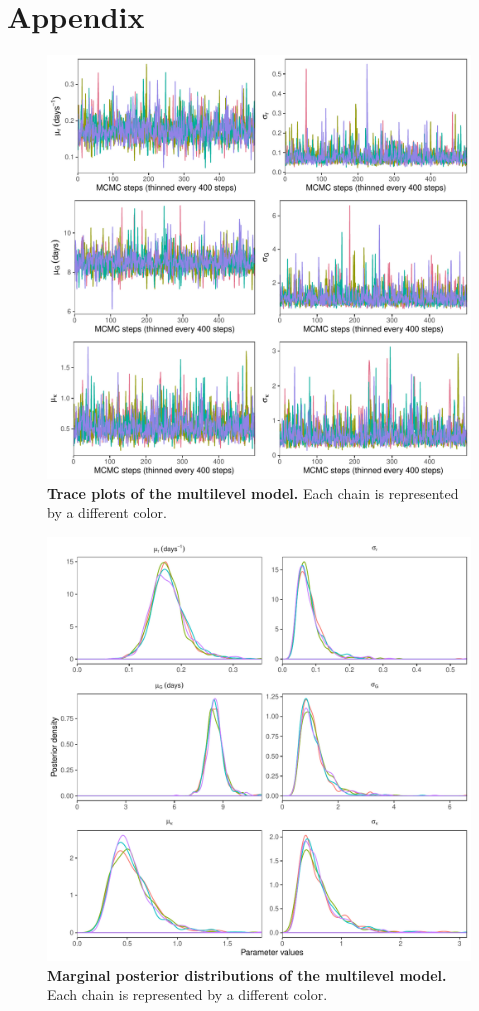 \documentclass[12pt]{article}
\begin{document}
\section*{Appendix}

\begin{figure}[!h]
\includegraphics[width=\textwidth]{posterior_chain.pdf}
\caption{
\textbf{Trace plots of the multilevel model.}
Each chain is represented by a different color.
}
\end{figure}

\pagebreak

\begin{figure}[!h]
\includegraphics[width=\textwidth]{posterior_dist.pdf}
\caption{
\textbf{Marginal posterior distributions of the multilevel model.}
Each chain is represented by a different color.
}
\end{figure}
\end{document}

